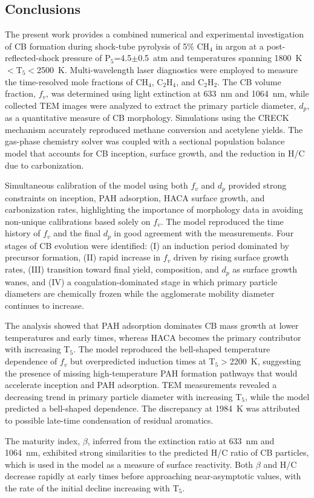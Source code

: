 \subsection{Conclusions}

The present work provides a combined numerical and experimental investigation of CB formation during shock-tube pyrolysis of 5\% CH$_4$ in argon at a post-reflected-shock pressure of P$_5$=4.5$\pm$0.5~atm and temperatures spanning 1800~K$<$T$_5$$<$2500~K. Multi-wavelength laser diagnostics were employed to measure the time-resolved mole fractions of CH$_4$, C$_2$H$_4$, and C$_2$H$_2$. The CB volume fraction, $f_v$, was determined using light extinction at 633~nm and 1064~nm, while collected TEM images were analyzed to extract the primary particle diameter, $d_p$, as a quantitative measure of CB morphology. Simulations using the CRECK mechanism accurately reproduced methane conversion and acetylene yields. The gas-phase chemistry solver was coupled with a sectional population balance model that accounts for CB inception, surface growth, and the reduction in H/C due to carbonization.

Simultaneous calibration of the model using both $f_v$ and $d_p$ provided strong constraints on inception, PAH adsorption, HACA surface growth, and carbonization rates, highlighting the importance of morphology data in avoiding non-unique calibrations based solely on $f_v$. The model reproduced the time history of $f_v$ and the final $d_p$ in good agreement with the measurements. Four stages of CB evolution were identified: (I) an induction period dominated by precursor formation, (II) rapid increase in $f_v$ driven by rising surface growth rates, (III) transition toward final yield, composition, and $d_p$ as surface growth wanes, and (IV) a coagulation-dominated stage in which primary particle diameters are chemically frozen while the agglomerate mobility diameter continues to increase.

The analysis showed that PAH adsorption dominates CB mass growth at lower temperatures and early times, whereas HACA becomes the primary contributor with increasing T$_5$. The model reproduced the bell-shaped temperature dependence of $f_v$ but overpredicted induction times at T$_5$$>$2200~K, suggesting the presence of missing high-temperature PAH formation pathways that would accelerate inception and PAH adsorption. TEM measurements revealed a decreasing trend in primary particle diameter with increasing T$_5$, while the model predicted a bell-shaped dependence. The discrepancy at 1984~K was attributed to possible late-time condensation of residual aromatics.

The maturity index, $\beta$, inferred from the extinction ratio at 633~nm and 1064~nm, exhibited strong similarities to the predicted H/C ratio of CB particles, which is used in the model as a measure of surface reactivity. Both $\beta$ and H/C decrease rapidly at early times before approaching near-asymptotic values, with the rate of the initial decline increasing with T$_5$.